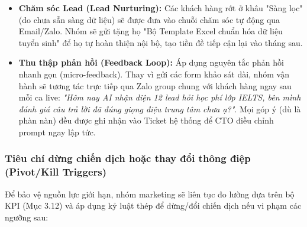 \begin{itemize}
    \item \textbf{Chăm sóc Lead (Lead Nurturing):} Các khách hàng rớt ở khâu "Sàng lọc" (do chưa sẵn sàng dữ liệu) sẽ được đưa vào chuỗi chăm sóc tự động qua Email/Zalo. Nhóm sẽ gửi tặng họ "Bộ Template Excel chuẩn hóa dữ liệu tuyển sinh" để họ tự hoàn thiện nội bộ, tạo tiền đề tiếp cận lại vào tháng sau.
    \item \textbf{Thu thập phản hồi (Feedback Loop):} Áp dụng nguyên tắc phản hồi nhanh gọn (micro-feedback). Thay vì gửi các form khảo sát dài, nhóm vận hành sẽ tương tác trực tiếp qua Zalo group chung với khách hàng ngay sau mỗi ca live: \textit{"Hôm nay AI nhận diện 12 lead hỏi học phí lớp IELTS, bên mình đánh giá câu trả lời đã đúng giọng điệu trung tâm chưa ạ?"}. Mọi góp ý (dù là phàn nàn) đều được ghi nhận vào Ticket hệ thống để CTO điều chỉnh prompt ngay lập tức.
\end{itemize}

\subsubsection{Tiêu chí dừng chiến dịch hoặc thay đổi thông điệp (Pivot/Kill Triggers)}

Để bảo vệ nguồn lực giới hạn, nhóm marketing sẽ liên tục đo lường dựa trên bộ KPI (Mục 3.12) và áp dụng kỷ luật thép để dừng/đổi chiến dịch nếu vi phạm các ngưỡng sau:

